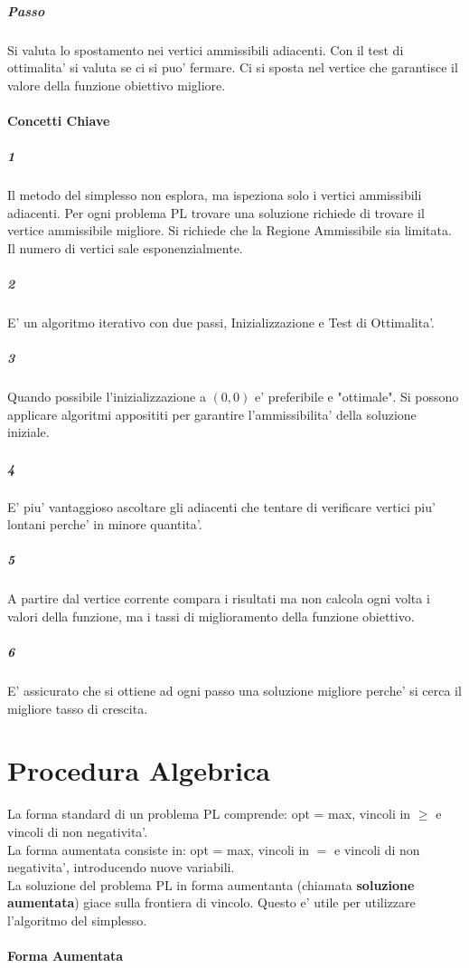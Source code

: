 \subparagraph{Passo}
Si valuta lo spostamento nei vertici ammissibili adiacenti.
Con il test di ottimalita' si valuta se ci si puo' fermare.
Ci si sposta nel vertice che garantisce il valore della funzione obiettivo migliore.

\paragraph{Concetti Chiave}

\subparagraph{1}
Il metodo del simplesso non esplora, ma ispeziona solo i vertici ammissibili adiacenti.
Per ogni problema PL trovare una soluzione richiede di trovare il vertice ammissibile migliore.
Si richiede che la Regione Ammissibile sia limitata.
Il numero di vertici sale esponenzialmente.

\subparagraph{2}
E' un algoritmo iterativo con due passi, Inizializzazione e Test di Ottimalita'.

\subparagraph{3}
Quando possibile l'inizializzazione a $(0,0)$ e' preferibile e "ottimale".
Si possono applicare algoritmi apposititi per garantire l'ammissibilita' della soluzione iniziale.

\subparagraph{4}
E' piu' vantaggioso ascoltare gli adiacenti che tentare di verificare vertici piu' lontani perche' in minore quantita'.

\subparagraph{5}
A partire dal vertice corrente compara i risultati ma non calcola ogni volta i valori della funzione, ma i tassi di miglioramento della funzione obiettivo.

\subparagraph{6}
E' assicurato che si ottiene ad ogni passo una soluzione migliore perche' si cerca il migliore tasso di crescita.

\section{Procedura Algebrica}

La forma standard di un problema PL comprende: opt = max, vincoli in $\geq$ e vincoli di non negativita'. \\
La forma aumentata consiste in: opt = max, vincoli in $=$ e vincoli di non negativita', introducendo nuove variabili. \\

La soluzione del problema PL in forma aumentanta (chiamata \textbf{soluzione aumentata}) giace sulla frontiera di vincolo.
Questo e' utile per utilizzare l'algoritmo del simplesso.

\paragraph{Forma Aumentata}

